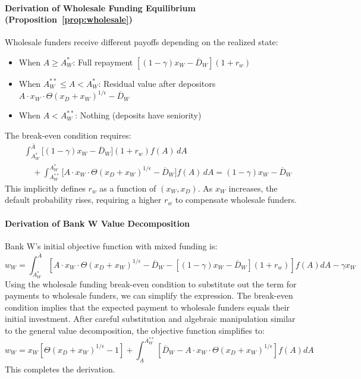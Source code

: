 \documentclass[12pt]{article}
\begin{document}
\paragraph{Derivation of Wholesale Funding Equilibrium (Proposition~\ref{prop:wholesale})}
\label{app:deriv-wholesale}
Wholesale funders receive different payoffs depending on the realized state:
\begin{itemize}
    \item When $A \ge A_{W}^{*}$: Full repayment $[(1-\gamma)x_{W} - \overline{D}_{W}](1+r_{w})$
    \item When $A_{W}^{**} \le A < A_{W}^{*}$: Residual value after depositors $A \cdot x_{W} \cdot \Theta(x_{D}+x_{W})^{1/\epsilon} - \overline{D}_{W}$
    \item When $A < A_{W}^{**}$: Nothing (deposits have seniority)
\end{itemize}
The break-even condition requires:
\begin{align}
&\int_{A_{W}^{*}}^{\overline{A}} \big[(1-\gamma)x_{W} - \overline{D}_{W}\big](1+r_{w}) f(A)\,dA \nonumber \\
&\quad + \int_{A_{W}^{**}}^{A_{W}^{*}} \big[A \cdot x_{W} \cdot \Theta(x_{D}+x_{W})^{1/\epsilon} - \overline{D}_{W}\big] f(A)\,dA = (1-\gamma)x_{W} - \overline{D}_{W}
\end{align}
This implicitly defines $r_{w}$ as a function of $(x_{W}, x_{D})$. As $x_{W}$ increases, the default probability rises, requiring a higher $r_{w}$ to compensate wholesale funders.

\paragraph{Derivation of Bank W Value Decomposition}
\label{app:deriv-W-value}
Bank W's initial objective function with mixed funding is:
\begin{equation}
w_{W} = \int_{A_{W}^{*}}^{\overline{A}}[A \cdot x_{W} \cdot \Theta(x_{D}+x_{W})^{1/\epsilon} - \overline{D}_{W} - [(1-\gamma)x_{W} - \overline{D}_{W}](1+r_{w})]f(A)dA - \gamma x_{W}
\end{equation}
Using the wholesale funding break-even condition to substitute out the term for payments to wholesale funders, we can simplify the expression. The break-even condition implies that the expected payment to wholesale funders equals their initial investment. After careful substitution and algebraic manipulation similar to the general value decomposition, the objective function simplifies to:
\begin{equation}
w_{W} = x_{W}[\Theta(x_{D}+x_{W})^{1/\epsilon}-1] + \int_{\underline{A}}^{A_{W}^{**}}[\overline{D}_{W} - A \cdot x_{W} \cdot \Theta(x_{D}+x_{W})^{1/\epsilon}]f(A)dA
\end{equation}
This completes the derivation.
\end{document}
